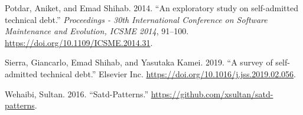 \documentclass[
]{article}
\newlength{\cslhangindent}
\newenvironment{cslreferences}%
  {\setlength{\parindent}{0pt}%
  \everypar{\setlength{\hangindent}{\cslhangindent}}\ignorespaces}%
  {\par}
\begin{document}
\hypertarget{refs}{}
\begin{cslreferences}
\leavevmode\hypertarget{ref-Potdar2014}{}%
Potdar, Aniket, and Emad Shihab. 2014. ``An exploratory study on
self-admitted technical debt.'' \emph{Proceedings - 30th International
Conference on Software Maintenance and Evolution, ICSME 2014}, 91--100.
\url{https://doi.org/10.1109/ICSME.2014.31}.

\leavevmode\hypertarget{ref-Sierra2019}{}%
Sierra, Giancarlo, Emad Shihab, and Yasutaka Kamei. 2019. ``A survey of
self-admitted technical debt.'' Elsevier Inc.
\url{https://doi.org/10.1016/j.jss.2019.02.056}.

\leavevmode\hypertarget{ref-Wehaibi2016}{}%
Wehaibi, Sultan. 2016. ``Satd-Patterns.''
\url{https://github.com/xsultan/satd-patterns}.
\end{cslreferences}
\end{document}
